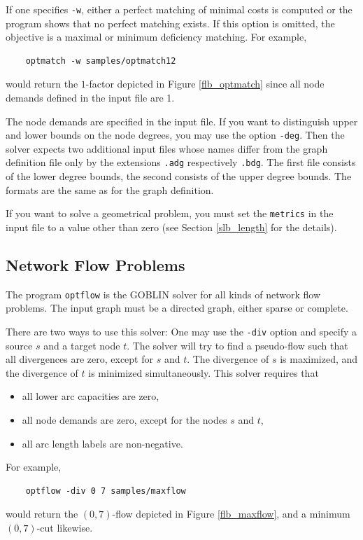 \documentclass[a4paper,11pt,twoside]{book}
\begin{document}
\begin{multicols}{2}
If one specifies \verb/-w/, either a perfect matching of minimal costs is
computed or the program shows that no perfect matching exists. If this option
is omitted, the objective is a maximal or minimum deficiency matching. For
example,
\begin{verbatim}
    optmatch -w samples/optmatch12
\end{verbatim}
would return the $1$-factor depicted in Figure \ref{flb_optmatch} since all
node demands defined in the input file are 1.

The node demands are specified in the input file. If you want to distinguish
upper and lower bounds on the node degrees, you may use the option \verb/-deg/.
Then the solver expects two additional input files whose names differ from
the graph definition file only by the extensions \verb/.adg/ respectively
\verb/.bdg/. The first file consists of the lower degree bounds, the second
consists of the upper degree bounds. The formats are the same as for the
graph definition.

If you want to solve a geometrical problem, you must set the \verb/metrics/ in
the input file to a value other than zero (see Section \ref{slb_length} for the
details).


\subsection{Network Flow Problems}
The program \verb/optflow/ is the GOBLIN solver for all kinds of network flow
problems. The input graph must be a directed graph, either sparse or complete.

There are two ways to use this solver: One may use the \verb/-div/ option
and specify a source $s$ and a target node $t$. The solver will try to find a
pseudo-flow such that all divergences are zero, except for $s$ and $t$. The
divergence of $s$ is maximized, and the divergence of $t$ is minimized
simultaneously. This solver requires that
\begin{itemize}
\item all lower arc capacities are zero,
\item all node demands are zero, except for the nodes $s$ and $t$,
\item all arc length labels are non-negative.
\end{itemize}
For example,
\begin{verbatim}
    optflow -div 0 7 samples/maxflow
\end{verbatim}
would return the $(0,7)$-flow depicted in Figure \ref{flb_maxflow}, and a
minimum $(0,7)$-cut likewise.


\end{multicols}
\end{document}
